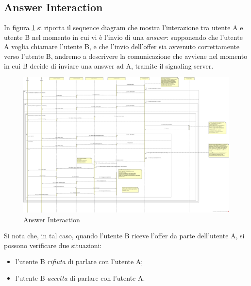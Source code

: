 \subsection{Answer Interaction}

In figura \ref{gfx:answerinteraction} si riporta il sequence diagram che mostra l'interazione tra utente A e utente B nel momento in cui vi è l'invio di una \textit{answer}: supponendo che l'utente A voglia chiamare l'utente B, e che l'invio dell'offer sia avvenuto correttamente verso l'utente B, andremo a descrivere la comunicazione che avviene nel momento in cui B decide di inviare una answer ad A, tramite il signaling server.

\begin{landscape}
\begin{center}
\begin{figure}[!htbp]
	\centering
	\includegraphics[scale = .26]{img/sequence_answer.png}
	\caption{Answer Interaction}
	\label{gfx:answerinteraction}
\end{figure}
\end{center}	
\end{landscape}%
Si nota che, in tal caso, quando l'utente B riceve l'offer da parte dell'utente A, si possono verificare due situazioni:
\begin{itemize}
\item l'utente B \textit{rifiuta} di parlare con l'utente A;
\item l'utente B \textit{accetta} di parlare con l'utente A.
\end{itemize}

